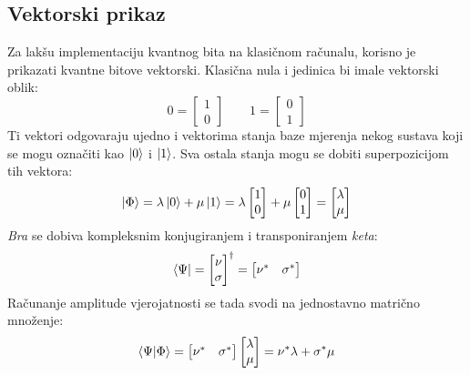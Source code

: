 \subsection{Vektorski prikaz}

Za lakšu implementaciju kvantnog bita na klasičnom računalu, korisno je prikazati kvantne bitove vektorski. Klasična nula i jedinica bi imale vektorski oblik:
\begin{equation}
0 = \begin{bmatrix}
1 \\ 0
\end{bmatrix}
\qquad
1 = \begin{bmatrix}
0 \\ 1
\end{bmatrix}
\end{equation}
Ti vektori odgovaraju ujedno i vektorima stanja baze mjerenja nekog sustava koji se mogu označiti kao $\ket{0}$ i $\ket{1}$. Sva ostala stanja mogu se dobiti superpozicijom tih vektora:
\begin{equation}
\ket{\Phi} = \lambda\ket{0} + \mu\ket{1} = \lambda\begin{bmatrix}
1 \\ 0
\end{bmatrix} + \mu\begin{bmatrix}
0 \\ 1
\end{bmatrix} = \begin{bmatrix}
\lambda \\ \mu
\end{bmatrix}
\end{equation}
\textit{Bra} se dobiva kompleksnim konjugiranjem i transponiranjem \textit{keta}:
\begin{equation}
\bra{\Psi} = \begin{bmatrix}
\nu \\ \sigma
\end{bmatrix}^\dagger
= \begin{bmatrix}
\nu^* & \sigma^*
\end{bmatrix}
\end{equation}
Računanje amplitude vjerojatnosti se tada svodi na jednostavno matrično množenje:
\begin{equation}
\braket{\Psi|\Phi} = \begin{bmatrix}
\nu^* & \sigma^*
\end{bmatrix}
\begin{bmatrix}
\lambda \\ \mu
\end{bmatrix} = \nu^*\lambda + \sigma^*\mu
\end{equation}



